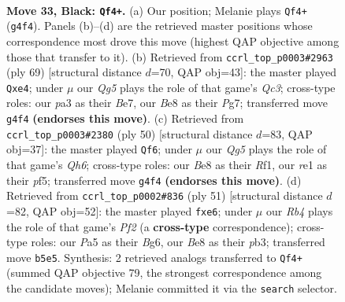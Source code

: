 \documentclass[11pt]{article}
\begin{document}
\clearpage

\begin{figure}[p]\centering
\begin{subfigure}{0.46\textwidth}\centering
\resizebox{\linewidth}{!}{%
\newchessgame
\chessboard[
  setfen={r3b1k1/p4pP1/8/pr2N3/4p1q1/PP6/1Q3P1K/R3R3 b - - 6 33},
  showmover=false,
  pgfstyle=straightmove, color=movearrow, markmove={g4-f4}
]}
\caption{}
\end{subfigure}\hfill
\begin{subfigure}{0.46\textwidth}\centering
\resizebox{\linewidth}{!}{%
\newchessgame
\chessboard[
  setfen={6k1/4b1p1/2qrP3/1p3r1p/3pQP2/P2R3P/5B1K/4R3 b - - 1 35},
  showmover=false,
  pgfstyle=straightmove, color=movearrow, markmove={c6-e4}
]}
\caption{}
\end{subfigure}
\\[4pt]
\begin{subfigure}{0.46\textwidth}\centering
\resizebox{\linewidth}{!}{%
\newchessgame
\chessboard[
  setfen={3r3r/pk3p2/1p5Q/3q1p2/3p4/P6P/1PP2P2/1K1R1R2 w - - 1 26},
  showmover=false,
  pgfstyle=straightmove, color=movearrow, markmove={h6-f6}
]}
\caption{}
\end{subfigure}\hfill
\begin{subfigure}{0.46\textwidth}\centering
\resizebox{\linewidth}{!}{%
\newchessgame
\chessboard[
  setfen={3q4/r4ppk/p3N1bp/3r4/8/1P1P4/PB1Q2PP/2R1R2K b - - 0 26},
  showmover=false,
  pgfstyle=straightmove, color=movearrow, markmove={f7-e6}
]}
\caption{}
\end{subfigure}
\caption{\textbf{Move 33, Black: \texttt{Qf4+}.} (a) Our position; Melanie plays \texttt{Qf4+} (\texttt{g4f4}). Panels (b)--(d) are the retrieved master positions whose correspondence most drove this move (highest QAP objective among those that transfer to it). (b) Retrieved from \texttt{ccrl\_top\_p0003\#2963} (ply 69) [structural distance $d$=70, QAP obj=43]: the master played \texttt{Qxe4}; under $\mu$ our \emph{Qg5} plays the role of that game's \emph{Qc3}; cross-type roles: our \emph{p}a3 as their \emph{B}e7, our \emph{B}e8 as their \emph{P}g7; transferred move \texttt{g4f4} \textbf{(endorses this move)}. (c) Retrieved from \texttt{ccrl\_top\_p0003\#2380} (ply 50) [structural distance $d$=83, QAP obj=37]: the master played \texttt{Qf6}; under $\mu$ our \emph{Qg5} plays the role of that game's \emph{Qh6}; cross-type roles: our \emph{B}e8 as their \emph{R}f1, our \emph{r}e1 as their \emph{p}f5; transferred move \texttt{g4f4} \textbf{(endorses this move)}. (d) Retrieved from \texttt{ccrl\_top\_p0002\#836} (ply 51) [structural distance $d$=82, QAP obj=52]: the master played \texttt{fxe6}; under $\mu$ our \emph{Rb4} plays the role of that game's \emph{Pf2} (a \textbf{cross-type} correspondence); cross-type roles: our \emph{P}a5 as their \emph{B}g6, our \emph{B}e8 as their \emph{p}b3; transferred move \texttt{b5e5}. Synthesis: 2 retrieved analogs transferred to \texttt{Qf4+} (summed QAP objective 79, the strongest correspondence among the candidate moves); Melanie committed it via the \texttt{search} selector.}
\label{fig:thought-m65}
\end{figure}
\end{document}
